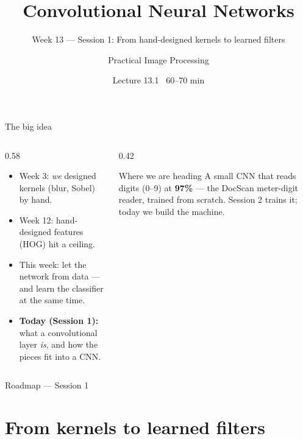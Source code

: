 \documentclass[10pt,aspectratio=169]{beamer}
\title{Convolutional Neural Networks}
\subtitle{Week 13 — Session 1: From hand-designed kernels to learned filters}
\author{Practical Image Processing}
\date{Lecture 13.1 \textbullet\ 60--70 min}
\begin{document}
\maketitle

\begin{frame}{The big idea}
  \begin{columns}[T]
    \begin{column}{0.58\textwidth}
      \begin{itemize}
        \item Week 3: \emph{we} designed kernels (blur, Sobel) by hand.
        \item Week 12: hand-designed features (HOG) hit a ceiling.
        \item \alert{This week:} let the network  from data --- and learn the classifier at the same time.
        \item \textbf{Today (Session 1):} what a convolutional layer \emph{is}, and how the pieces fit into a CNN.
      \end{itemize}
    \end{column}
    \begin{column}{0.42\textwidth}
      \begin{alertblock}{Where we are heading}
        A small CNN that reads digits (0--9) at \textbf{97\%} --- the DocScan meter-digit reader, trained from scratch. Session 2 trains it; today we build the machine.
      \end{alertblock}
    \end{column}
  \end{columns}
\end{frame}

\begin{frame}{Roadmap --- Session 1}\tableofcontents\end{frame}

\section{From kernels to learned filters}
\end{document}
